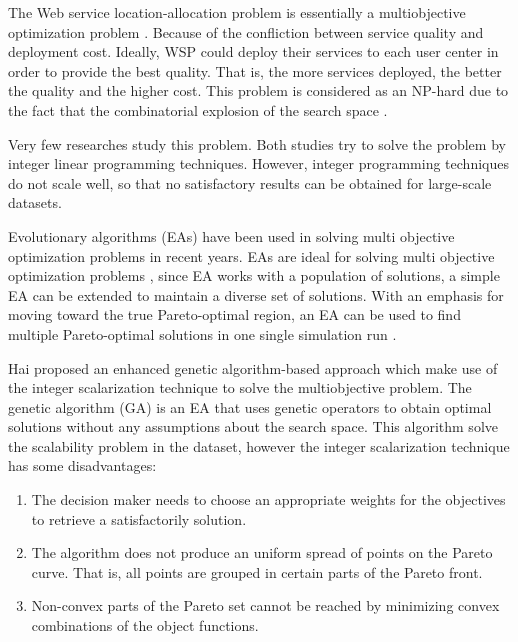 \documentclass[11pt, a4paper, oneside, openright]{article}
\begin{document}
The Web service location-allocation problem is essentially a multiobjective optimization problem \cite{Multiobjective}.
Because of the confliction between service quality and deployment cost. 
Ideally, WSP could deploy their services to each user center in order to provide the best quality.
That is, the more services deployed, the better the quality and the higher cost. 
This problem is considered as an NP-hard due to the fact that the combinatorial explosion of the search space \cite{Vanrompay:2008:GAO:1387309.1387313}. 


Very few researches \cite{Aboolian200964, Sun:2006:LMW:1217741.1217754} study this problem.
Both studies try to solve the problem by integer linear programming techniques.
However, integer programming techniques do not scale well, so that no satisfactory results can be obtained for large-scale datasets. 

Evolutionary algorithms (EAs) have been used in solving multi objective optimization problems in recent years. 
EAs are ideal for solving multi objective optimization problems \cite{key:article}, since EA works with a population of solutions, a simple EA can be extended to maintain a diverse set of solutions.
With an emphasis for moving toward the true Pareto-optimal region, an EA can be used to find multiple Pareto-optimal solutions in one single simulation run \cite{OptimizationElectrical}.

Hai \cite{EnhancedGenetic} proposed an enhanced genetic algorithm-based approach which make use of the integer scalarization technique to solve the multiobjective problem.
The genetic algorithm (GA) is an EA that uses genetic operators to obtain optimal solutions without any assumptions about the search space.
This algorithm solve the scalability problem in the dataset, however the integer scalarization technique \cite{Multiobjective} has some disadvantages: 

\begin{enumerate}
	\item The decision maker needs to choose an appropriate weights for the objectives to retrieve a satisfactorily solution.
	\item The algorithm does not produce an uniform spread of points on the Pareto curve. That is, all points are grouped in certain parts of the Pareto front.
	\item Non-convex parts of the Pareto set cannot be reached by minimizing convex combinations of the object functions.
\end{enumerate}
\end{document}
